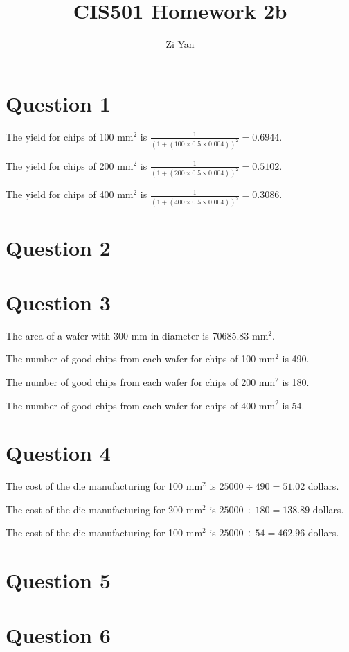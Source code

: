 \documentclass[12pt,letterpaper]{article}
\author{Zi Yan}
\date{}
\title{CIS501 Homework 2b}
\begin{document}
\maketitle

\section*{Question 1}
The yield for chips of 100 $\mbox{mm}^2$ is $\frac{1}{(1+(100\times 
0.5 \times 0.004))^2} = 0.6944$.

The yield for chips of 200 $\mbox{mm}^2$ is $\frac{1}{(1+(200\times 
0.5 \times 0.004))^2} = 0.5102$.

The yield for chips of 400 $\mbox{mm}^2$ is $\frac{1}{(1+(400\times 
0.5 \times 0.004))^2} = 0.3086$.

\section*{Question 2}

\section*{Question 3}
The area of a wafer with 300 mm in diameter is 70685.83 
$\mbox{mm}^2$.

The number of good chips from each wafer for chips of 100 
$\mbox{mm}^2$ is 490.

The number of good chips from each wafer for chips of 200 
$\mbox{mm}^2$ is 180.

The number of good chips from each wafer for chips of 400 
$\mbox{mm}^2$ is 54.

\section*{Question 4}
The cost of the die manufacturing for 100 $\mbox{mm}^2$ is $25000 
\div 490 = 51.02$ dollars.

The cost of the die manufacturing for 200 $\mbox{mm}^2$ is $25000 
\div 180 = 138.89$ dollars.

The cost of the die manufacturing for 100 $\mbox{mm}^2$ is $25000 
\div 54 = 462.96$ dollars.

\section*{Question 5}
\section*{Question 6}
\end{document}
